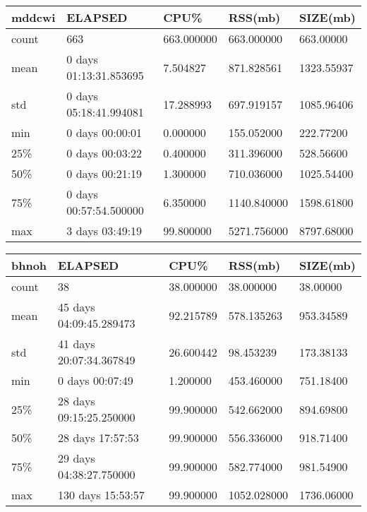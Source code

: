 \documentclass{article}
\begin{document}
\begin{tabular}{|l|l|l|l|l|}
\hline 
\hline mddcwi& ELAPSED&   CPU\%&  RSS(mb)&   SIZE(mb) \\
\hline count&    663& 663.000000&  663.000000&  663.00000 \\
\hline mean&  0 days 01:13:31.853695&  7.504827&  871.828561& 1323.55937 \\
\hline std&  0 days 05:18:41.994081&  17.288993&  697.919157& 1085.96406 \\
\hline min&   0 days 00:00:01&  0.000000&  155.052000&  222.77200 \\
\hline 25\%&   0 days 00:03:22&  0.400000&  311.396000&  528.56600 \\
\hline 50\%&   0 days 00:21:19&  1.300000&  710.036000& 1025.54400 \\
\hline 75\%&  0 days 00:57:54.500000&  6.350000& 1140.840000& 1598.61800 \\
\hline max&   3 days 03:49:19&  99.800000& 5271.756000& 8797.68000 \\
\hline 
\end{tabular}
 
\begin{tabular}{|l|l|l|l|l|}
\hline 
\hline bhnoh&    ELAPSED&   CPU\%&  RSS(mb)&   SIZE(mb) \\
\hline count&    38& 38.000000&  38.000000&  38.00000 \\
\hline mean&  45 days 04:09:45.289473& 92.215789&  578.135263&  953.34589 \\
\hline std&  41 days 20:07:34.367849& 26.600442&  98.453239&  173.38133 \\
\hline min&   0 days 00:07:49&  1.200000&  453.460000&  751.18400 \\
\hline 25\%&  28 days 09:15:25.250000& 99.900000&  542.662000&  894.69800 \\
\hline 50\%&   28 days 17:57:53& 99.900000&  556.336000&  918.71400 \\
\hline 75\%&  29 days 04:38:27.750000& 99.900000&  582.774000&  981.54900 \\
\hline max&  130 days 15:53:57& 99.900000& 1052.028000& 1736.06000 \\
\hline 
\end{tabular}
 
\end{document}
